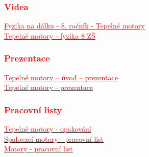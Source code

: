 \subsubsection*{\textcolor{red}{Videa}}
\href{https://www.youtube.com/watch?v=dR1pyp3q9Ko}{\textcolor{red}{Fyzika na dálku - 8. ročník - Tepelné motory}}\\
\href{https://www.youtube.com/watch?v=k9DhdvbmRiw}{\textcolor{red}{Tepelné motory - fyzika 8 ZŠ}}
\subsubsection*{\textcolor{red}{Prezentace}}
\href{https://zs-nucice.cz/UserFiles/File/eu_new_361-400/VY_32_INOVACE_374.pdf}{\textcolor{red}{Tepelné motory -- úvod -- prezentace}}\\
\href{https://view.officeapps.live.com/op/view.aspx?src=http://dumy.cz/nahled/73077}{\textcolor{red}{Tepelné motory - prezentace}}
\subsubsection*{\textcolor{red}{Pracovní listy}}
\href{https://www.google.com/url?sa=i&url=https\%3A\%2F\%2Fslideplayer.cz\%2Fslide\%2F12677857\%2F&psig=AOvVaw0fGM8NbBvM9WlZNO6TqO0o&ust=1741690312947000&source=images&cd=vfe&opi=89978449&ved=0CAMQjB1qFwoTCMCD2Zes_4sDFQAAAAAdAAAAABBP}{\textcolor{red}{Tepelné motory - opakování}}\\
\href{https://view.officeapps.live.com/op/view.aspx?src=http://dumy.cz/nahled/117673}{\textcolor{red}{Spalovací motory - pracovní list}}\\
\href{https://www.soshlinky.cz/documents/uploads/71\%20Motory.xlsx}{\textcolor{red}{Motory - pracovní list}}